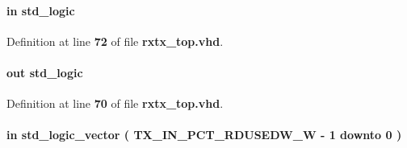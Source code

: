\paragraph[{tx\+\_\+in\+\_\+pct\+\_\+rdempty}]{ {\bfseries \textcolor{keywordflow}{in}\textcolor{vhdlchar}{ }} {\bfseries \textcolor{comment}{std\+\_\+logic}\textcolor{vhdlchar}{ }} \hspace{0.3cm}{\ttfamily [Port]}}\label{classrxtx__top_a0c3a66a0ab89522d854fb19664bfc887}


Definition at line {\bf 72} of file {\bf rxtx\+\_\+top.\+vhd}.

\paragraph[{tx\+\_\+in\+\_\+pct\+\_\+rdreq}]{ {\bfseries \textcolor{keywordflow}{out}\textcolor{vhdlchar}{ }} {\bfseries \textcolor{comment}{std\+\_\+logic}\textcolor{vhdlchar}{ }} \hspace{0.3cm}{\ttfamily [Port]}}\label{classrxtx__top_a8622a354cb56b88d60fa91f94e735aba}


Definition at line {\bf 70} of file {\bf rxtx\+\_\+top.\+vhd}.

\paragraph[{tx\+\_\+in\+\_\+pct\+\_\+rdusedw}]{ {\bfseries \textcolor{keywordflow}{in}\textcolor{vhdlchar}{ }} {\bfseries \textcolor{comment}{std\+\_\+logic\+\_\+vector}\textcolor{vhdlchar}{ }\textcolor{vhdlchar}{(}\textcolor{vhdlchar}{ }\textcolor{vhdlchar}{ }\textcolor{vhdlchar}{ }\textcolor{vhdlchar}{ }{\bfseries {\bf T\+X\+\_\+\+I\+N\+\_\+\+P\+C\+T\+\_\+\+R\+D\+U\+S\+E\+D\+W\+\_\+W}} \textcolor{vhdlchar}{-\/}\textcolor{vhdlchar}{ } \textcolor{vhdldigit}{1} \textcolor{vhdlchar}{ }\textcolor{keywordflow}{downto}\textcolor{vhdlchar}{ }\textcolor{vhdlchar}{ } \textcolor{vhdldigit}{0} \textcolor{vhdlchar}{ }\textcolor{vhdlchar}{)}\textcolor{vhdlchar}{ }} \hspace{0.3cm}{\ttfamily [Port]}}\label{classrxtx__top_a9fc15fe7f298bfcf58f756e698ac4332}


